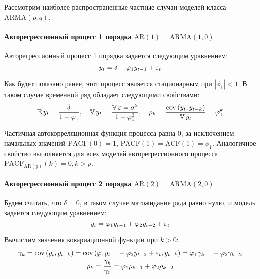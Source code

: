 
Рассмотрим наиболее распространенные частные случаи моделей класса $\mathrm{ARMA}\left( p, q \right)$.

\paragraph{Авторегрессионный процесс 1 порядка $\mathrm{AR}(1) = \mathrm{ARMA}(1, 0)$}

Авторегрессионный процесс 1 порядка задается следующим уравнением:
\begin{equation*}
    y_t = \delta + \varphi_1 y_{t-1} + \varepsilon_t
\end{equation*}

Как будет показано ранее, этот процесс является стационарным при $|\phi_1| < 1$.
В таком случае временной ряд обладает следующими свойствами:
\begin{equation*}
    \operatorname{\mathbb{E}} y_t = \frac{\delta}{1 - \varphi_1}, \quad
    \operatorname{\mathbb{V}} y_t = \frac{\operatorname{\mathbb{V}} \varepsilon = \sigma^2}{1 - \varphi_1^2}, \quad
    \rho_k = \frac{\operatorname{cov}\left( y_t, y_{t-k} \right)}{\operatorname{\mathbb{V}} y_t} = \varphi_1^k
\end{equation*}

Частичная автокорреляционная функция процесса равна 0, за исключением начальных значений $\mathrm{PACF}(0) = 1$, $\mathrm{PACF}(1) = \mathrm{ACF}(1) = \phi_1$.
Аналогичное свойство выполняется для всех моделей авторегрессионного процесса $\mathrm{PACF}_{\mathrm{AR\left( p \right)}}(k) = 0, k>p$.


\paragraph{Авторегрессионный процесс 2 порядка $\mathrm{AR}(2) = \mathrm{ARMA}(2, 0)$}

Будем считать, что $\delta = 0$, в таком случае матожидание ряда равно нулю, и модель задается следующим уравнением:
\begin{equation}
\label{15_1}
    y_t = \varphi_1 y_{t-1} + \varphi_2 y_{t-2} + \varepsilon_t
\end{equation}

Вычислим значения ковариационной функции при $k > 0$:
\begin{gather}
\nonumber
    \gamma_k =
    \operatorname{cov}\left( y_t, y_{t-k} \right) =
    \operatorname{cov}\left( \varphi_1 y_{t-1} + \varphi_2 y_{t-2} + \varepsilon_t, y_{t-k} \right) =
    \varphi_1 \gamma_{k-1} + \varphi_2 \gamma_{k-2}\\
\label{15_2}
    \rho_k = \frac{\gamma_k}{\gamma_0} = \varphi_1 \rho_{k-1} + \varphi_2 \rho_{k-2}
\end{gather}

